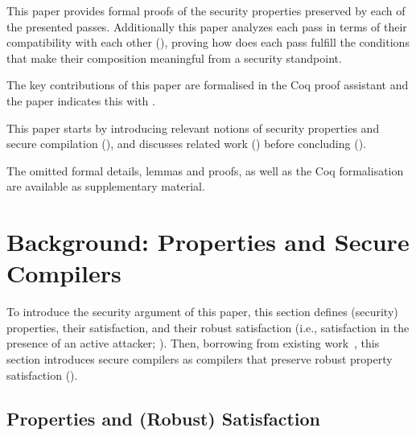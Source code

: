 \documentclass[dvipsnames,conference]{IEEEtran}
\theoremstyle{definition}
\begin{document}
\begin{asparaitem}[$\blacktriangleright$]
  \item %
  		This paper provides formal proofs of the security properties preserved by each of the presented passes. 
  		Additionally this paper analyzes each pass in terms of their compatibility with each other (), proving how does each pass fulfill the conditions that make their composition meaningful from a security standpoint.

  \item The key contributions of this paper are formalised in the Coq proof assistant and the paper indicates this with \CoqSymbol.
\end{asparaitem}
% 
This paper starts by introducing relevant notions of security properties and secure compilation (),
and discusses related work () before concluding ().

The omitted formal details, lemmas and proofs, as well as the Coq formalisation are available as supplementary material.













\section{Background: Properties and Secure Compilers}\label{sec:background}

To introduce the security argument of this paper, this section defines (security) properties, their satisfaction, and their robust satisfaction (i.e., satisfaction in the presence of an active attacker; ).
Then, borrowing from existing work~\cite{abate2019jour,abate2021extacc}, this section introduces secure compilers as compilers that preserve robust property satisfaction ().

\subsection{Properties and (Robust) Satisfaction}\label{subsec:bg:tprop}
\end{document}
